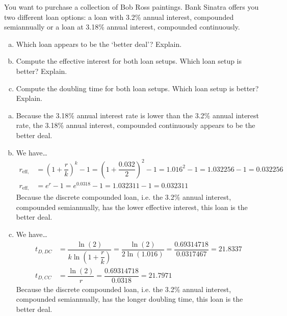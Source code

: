 \documentclass[11pt,letterpaper]{article}
\begin{document}

 You want to purchase a collection of Bob Ross paintings. Bank Sinatra offers you two different loan options: a loan with 3.2\% annual interest, compounded semiannually or a loan at 3.18\% annual interest, compounded continuously. 
	\begin{enumerate}[(a)]
	\item Which loan appears to be the `better deal'? Explain. 
	\item Compute the effective interest for both loan setups. Which loan setup is better? Explain. 
	\item Compute the doubling time for both loan setups. Which loan setup is better? Explain.
	\end{enumerate} \pspace

\sol 
\begin{enumerate}[(a)]
\item Because the 3.18\% annual interest rate is lower than the 3.2\% annual interest rate, the 3.18\% annual interest, compounded continuously appears to be the better deal. \pspace

\item We have\dots
	\[
	\begin{aligned}
	r_{\text{eff, DC}}&= \left(1 + \dfrac{r}{k} \right)^k - 1= \left(1 + \dfrac{0.032}{2} \right)^2 - 1= 1.016^2 - 1= 1.032256 - 1= 0.032256 \\[0.3cm]
	r_{\text{eff, CC}}&= e^r - 1= e^{0.0318} - 1= 1.032311 - 1= 0.032311
	\end{aligned}
	\]
Because the discrete compounded loan, i.e. the 3.2\% annual interest, compounded semiannually, has the lower effective interest, this loan is the better deal. \pspace
 
\item We have\dots
	\[
	\begin{aligned}
	t_{D, DC}&= \dfrac{\ln(2)}{k \ln \left(1 + \dfrac{r}{k} \right)}= \dfrac{\ln(2)}{2 \ln(1.016)}= \dfrac{0.69314718}{0.0317467}= 21.8337 \\[0.3cm]
	t_{D, CC}&= \dfrac{\ln(2)}{r}= \dfrac{0.69314718}{0.0318}= 21.7971
	\end{aligned}
	\]
Because the discrete compounded loan, i.e. the 3.2\% annual interest, compounded semiannually, has the longer doubling time, this loan is the better deal.  
\end{enumerate}
\end{document}
